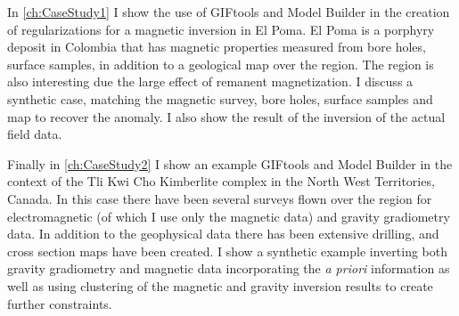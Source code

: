 In \autoref{ch:CaseStudy1} I show the use of GIFtools and Model Builder in the creation of regularizations for a magnetic inversion in El Poma. El Poma is a porphyry deposit in Colombia that has magnetic properties measured from bore holes, surface samples, in addition to a geological map over the region. The region is also interesting due the large effect of remanent magnetization. I discuss a synthetic case, matching the magnetic survey, bore holes, surface samples and map to recover the anomaly. I also show the result of the inversion of the actual field data.

Finally in \autoref{ch:CaseStudy2} I show an example GIFtools and Model Builder in the context of the Tli Kwi Cho Kimberlite complex in the North West Territories, Canada. In this case there have been several surveys flown over the region for electromagnetic (of which I use only the magnetic data) and gravity gradiometry data. In addition to the geophysical data there has been extensive drilling, and cross section maps have been created. I show a synthetic example inverting both gravity gradiometry and magnetic data incorporating the \emph{a priori} information as well as using clustering of the magnetic and gravity inversion results to create further constraints.







\endinput

Interestingly, the assumption that all magnetizations are in the same direction also assumes that all Koenigsberger ratios are equal.

Any text after an \endinput is ignored.
You could put scraps here or things in progress.
